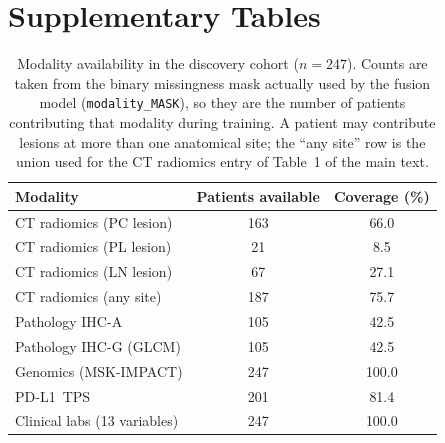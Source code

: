 \documentclass[12pt]{article}
\begin{document}
\section{Supplementary Tables}

\begin{table}[H]
\centering
\caption{Modality availability in the discovery cohort ($n = 247$).
  Counts are taken from the binary missingness mask actually used by the
  fusion model (\texttt{modality\_MASK}), so they are the number of patients
  contributing that modality during training. A patient may contribute
  lesions at more than one anatomical site; the ``any site'' row is the
  union used for the CT radiomics entry of Table~1 of the main text.}
\label{tab:supp_modality}
\begin{tabular}{lcc}
\toprule
\textbf{Modality} & \textbf{Patients available} & \textbf{Coverage (\%)} \\
\midrule
CT radiomics (PC lesion)   & 163 & 66.0  \\
CT radiomics (PL lesion)   & 21  & 8.5   \\
CT radiomics (LN lesion)   & 67  & 27.1  \\
CT radiomics (any site)    & 187 & 75.7  \\
Pathology IHC-A            & 105 & 42.5  \\
Pathology IHC-G (GLCM)     & 105 & 42.5  \\
Genomics (MSK-IMPACT) & 247 & 100.0 \\
PD-L1~TPS                  & 201 & 81.4  \\
Clinical labs (13 variables) & 247 & 100.0 \\
\bottomrule
\end{tabular}
\end{table}
\end{document}
